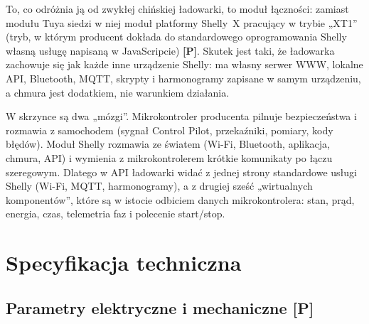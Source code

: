\documentclass[11pt,a4paper]{article}
\newcommand{\tagP}{\textcolor{apgreen}{\textbf{[P]}}}
\begin{document}
To, co odróżnia ją od zwykłej chińskiej ładowarki, to moduł łączności: zamiast modułu Tuya siedzi w niej moduł platformy Shelly~X pracujący w trybie „XT1” (tryb, w którym producent dokłada do standardowego oprogramowania Shelly własną usługę napisaną w JavaScripcie) \tagP. Skutek jest taki, że ładowarka zachowuje się jak każde inne urządzenie Shelly: ma własny serwer WWW, lokalne API, Bluetooth, MQTT, skrypty i harmonogramy zapisane w samym urządzeniu, a chmura jest dodatkiem, nie warunkiem działania.

\begin{info}
W skrzynce są dwa „mózgi”. Mikrokontroler producenta pilnuje bezpieczeństwa i rozmawia z samochodem (sygnał Control Pilot, przekaźniki, pomiary, kody błędów). Moduł Shelly rozmawia ze światem (Wi-Fi, Bluetooth, aplikacja, chmura, API) i wymienia z mikrokontrolerem krótkie komunikaty po łączu szeregowym. Dlatego w API ładowarki widać z jednej strony standardowe usługi Shelly (Wi-Fi, MQTT, harmonogramy), a z drugiej sześć „wirtualnych komponentów”, które są w istocie odbiciem danych mikrokontrolera: stan, prąd, energia, czas, telemetria faz i polecenie start/stop.
\end{info}

\section{Specyfikacja techniczna}

\subsection{Parametry elektryczne i mechaniczne \tagP}
\end{document}

